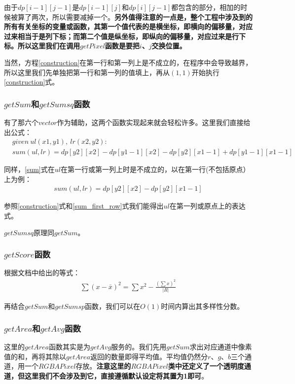 \documentclass[UTF8]{ctexart}
\begin{document}
			\indent 由于$dp[i-1][j-1]$是$dp[i-1][j]$和$dp[i][j-1]$都包含的部分，相加的时候被算了两次，所以需要减掉一个。\textbf{另外值得注意的一点是，整个工程中涉及到的所有有关坐标的变量或函数，其第一个值代表的是横坐标，即横向的偏移量，对应过来相当于是列下标；而第二个值是纵坐标，即纵向的偏移量，对应过来是行下标。所以这里我们在调用$getPixel$函数是要把$i$、$j$交换位置。}
			
			\indent 当然，方程\ref{construction}在第一行和第一列上是不成立的，在程序中会导致越界，所以这里我们先单独把第一行和第一列的值填上，再从$(1, 1)$开始执行\ref{construction}式。
				
			\subsubsection{$getSum$和$getSumsq$函数}
			\indent 有了那六个$vector$作为辅助，这两个函数实现起来就会轻松许多。这里我们直接给出公式：	
			\begin{align}
			&given\ ul(x1, y1),\ lr(x2, y2): \\			
			&sum(ul, lr) = dp[y2][x2] - dp[y1-1][x2] - dp[y2][x1-1] + dp[y1-1][x1-1] \label{sum}
			\end{align}
		    
		    \indent 同样，\ref{sum}式在$ul$在第一行或第一列上时是不成立的，以在第一行(不包括原点）上为例：
		    \begin{align}
		    sum(ul, lr) = dp[y2][x2] - dp[y2][x1-1] \label{sum_first_row}
		    \end{align}

            \indent 参照\ref{construction}式和\ref{sum_first_row}式我们能得出$ul$在第一列或原点上的表达式。
            
            \indent $getSumsq$原理同$getSum$。
            
            \subsubsection{$getScore$函数}
            \indent 根据文档中给出的等式：
            \begin{align}
            \sum(x - \bar{x})^{2} = \sum x^2 - \frac{(\sum x)^2}{|R|} \label{score}
            \end{align} 
            
            \indent 再结合$getSum$和$getSumsp$函数，我们可以在$O(1)$时间内算出其多样性分数。
            \subsubsection{$getArea$和$getAvg$函数}  
            \indent 这里的$getArea$函数其实是为$getAvg$服务的。我们先用$getSum$求出对应通道中像素值的和，再将其除以$getArea$返回的数量即得平均值。平均值仍然分$r$、$g$、$b$三个通道，用一个$RGBAPixel$存放。\textbf{注意这里的$RGBAPixel$类中还定义了一个透明度通道，但这里我们不会涉及到它，直接遵循默认设定将其置为1即可}。      		    
\end{document}
